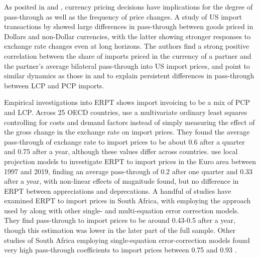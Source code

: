 \documentclass[12pt]{article}
\begin{document}
As posited in \textcite{betts2000exchange} and \textcite{devereux2003monetary}, currency pricing decisions have implications for the degree of pass-through as well as the frequency of price changes. A study of US import transactions by \textcite{gopinath2010currency} showed large differences in pass-through between goods priced in Dollars and non-Dollar currencies, with the latter showing stronger responses to exchange rate changes even at long horizons. The authors find a strong positive correlation between the share of imports priced in the currency of a partner and the partner's average bilateral pass-through into US import prices, and point to similar dynamics as those in \textcite{dornbusch1985exchange} and \textcite{krugman1986} to explain persistent differences in pass-through between LCP and PCP imports. 

Empirical investigations into ERPT shows import invoicing to be a mix of PCP and LCP.  Across 25 OECD countries, \textcite{campa2005exchange} use a multivariate ordinary least squares controlling for costs and demand factors instead of simply measuring the effect of the gross change in the exchange rate on import prices. They found the average pass-through of exchange rate to import prices to be about 0.6 after a quarter and 0.75 after a year, although these values differ across countries. \textcite{colavecchio2019non} use local projection models to investigate ERPT to import prices in the Euro area between 1997 and 2019, finding an average pass-through of 0.2 after one quarter and 0.33 after a year, with non-linear effects of magnitude found, but no difference in ERPT between appreciations and deprecations. A handful of studies have examined ERPT to import prices in South Africa, with \textcite{aronetal2012} employing the approach used by \textcite{campa2005exchange} along with other single- and multi-equation error correction models. They find pass-through to import prices to be around 0.43-0.5 after a year, though this estimation was lower in the later part of the full sample. Other studies of South Africa employing single-equation error-correction models found very high pass-through coefficients to import prices between 0.75 and 0.93 \parencite{Karoroetal2008, kabundi2016exchange}. 
\end{document}

